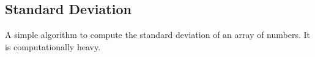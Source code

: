 \subsection{Standard Deviation}
A simple algorithm to compute the standard deviation of an array of numbers. It is computationally heavy.
